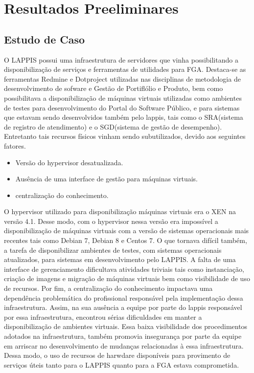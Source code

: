 \chapter{Resultados Preeliminares}
\section{Estudo de Caso}
O LAPPIS possui uma infraestrutura de servidores que vinha possibilitando a disponibilização de serviços e ferramentas de utilidades para FGA. Destaca-se as ferramentas Redmine e Dotproject utilizadas nas disciplinas de metodologia de desenvolvimento de sofware e Gestão de Portiflólio e Produto, bem como possibilitava a disponibilização de máquinas virtuais utilizadas como ambientes de testes para desenvolvimento do Portal do Software Público, e para sistemas que estavam sendo desenvolvidos também pelo  lappis, tais como o SRA(sistema de registro de atendimento) e o SGD(sistema de gestão de desempenho). Entretanto tais recursos físicos vinham sendo subutilizados, devido aos seguintes fatores.
\begin{itemize}
 \item Versão do hypervisor desatualizada.
 \item Ausência de uma interface de gestão para máquinas virtuais.
 \item centralização do conhecimento.
\end{itemize}
      
      O hypervisor utilizado para disponibilização máquinas virtuais era o XEN na versão 4.1. Desse modo, com  o hypervisor nessa versão era impossível a disponibilização de máquinas virtuais com a versão de sistemas operacionais mais recentes tais como Debian 7, Debian 8 e Centos 7. O que tornava difícil também, a tarefa de disponibilizar ambientes de testes, com sistemas operacionais atualizados, para sistemas em desenvolvimento pelo LAPPIS. A falta de uma interface de gerenciamento dificultava atividades triviais tais como instanciação, criação de imagens e migração de máquinas virtuais bem como visibilidade de uso de recursos. Por fim, a centralização do conhecimento impactava uma dependência problemática do profissional responsável pela implementação dessa infraestrutura. Assim, na sua ausência a equipe por parte do lappis responsável por essa infraestrutura, encontrou sérias dificuldades em manter a disponibilização de ambientes virtuais. Essa baixa visibilidade dos procedimentos adotados na infraestrutura, também promovia insegurança por parte da equipe em arriscar no desenvolvimento de mudanças relacionadas à essa infraestrutura. Dessa modo, o uso de recursos de harwdare disponíveis para provimento de serviços úteis tanto para o LAPPIS quanto para a FGA estava comprometida. 
      
